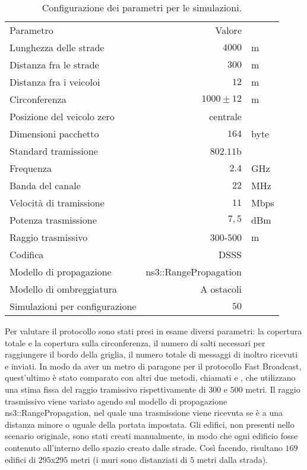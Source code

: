 \begin{table}[!h]
	\centering
	\begin{tabular}{| L{.4\linewidth} | r  l |}
		\toprule
		Parametro															&			Valore 							&					\\
		\thickerline
		Lunghezza delle strade								&			$4000$							& m				\\
		Distanza fra le strade								&			$300$								& m				\\
		Distanza fra i veicoloi								&			$12$ 								& m				\\
		Circonferenza													&			$1000\pm12$					& m				\\
		Posizione del veicolo zero						&			centrale						&					\\
		\thickerline
		Dimensioni pacchetto									&				$164$							&			byte		\\	\hline
		Standard tramissione									&				$802.11$b					&							\\	\hline
		Frequenza															&				$2.4$							&			GHz			\\	\hline
		Banda del canale											&				$22$							&			MHz			\\	\hline
		Velocità di tramissione								&				$11$							&			Mbps		\\	\hline
		Potenza trasmissione									&				$7,5$							&			dBm			\\	\hline
		Raggio trasmissivo										&				$300$-$500$				&			m				\\	\hline
		Codifica															&				DSSS\footnotemark	&							\\	\hline
		Modello di propagazione								&				\textsf{ns3::RangePropagation}	&							\\	\hline
		Modello di ombreggiatura							&				A ostacoli				&							\\	\hline
		\thickerline
		Simulazioni	per configurazione				&			$50$								&					\\
		\bottomrule
	\end{tabular}
	\caption{Configurazione dei parametri per le simulazioni.\label{tab:parametri-simulazioni-barichello}}
\end{table}
%
Per valutare il protocollo sono stati presi in esame diversi parametri: la copertura totale e la copertura sulla circonferenza,
il numero di salti necessari per raggiungere il bordo della griglia, il numero totale di messaggi di inoltro ricevuti e inviati.
In modo da aver un metro di paragone per il protocollo Fast Broadcast, quest'ultimo è stato comparato con altri due metodi, chiamati \statica e \staticb,
che utilizzano una stima fissa del raggio tramissivo rispettivamente di $300$ e $500$ metri.
Il raggio trasmissivo viene variato agendo sul modello di propagazione \textsf{ns3::RangePropagation},
nel quale una trasmissione viene ricevuta se è a una distanza minore o uguale della portata impostata.
Gli edifici, non presenti nello scenario originale, sono stati creati manualmente, in modo che ogni edificio fosse contenuto all'interno dello spazio creato dalle strade.
Così facendo, risultano $169$ edifici di $295$x$295$ metri (i muri sono distanziati di $5$ metri dalla strada).

